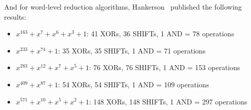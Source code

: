 And for word-level reduction algorithms, Hankerson~\cite[p. 76]{hankerson2006guide} published the following results:

\begin{itemize}
\item $x^{163} + x^7 + x^6 + x^3 + 1$: 41 XORs, 36 SHIFTs, 1 AND = 78 operations
\item $x^{233} + x^{74} + 1$: 35 XORs, 35 SHIFTs, 1 AND = 71 operations
\item $x^{283} + x^{12} + x^7 + x^5 + 1$: 76 XORs, 76 SHIFTs, 1 AND = 153 operations
\item $x^{409} + x^{87} + 1$: 54 XORs, 54 SHIFTs, 1 AND = 109 operations
\item $x^{571} + x^{10} + x^5 + x^2 + 1$: 148 XORs, 148 SHIFTs, 1 AND = 297 operations
\end{itemize}